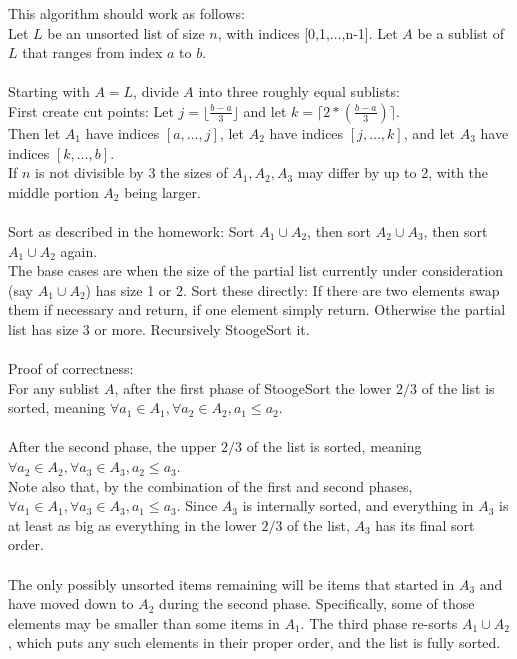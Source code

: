 \documentclass[11pt]{article}
\begin{document}
This algorithm should work as follows: \\
Let $L$ be an unsorted list of size $n$, with indices [0,1,...,n-1]. Let $A$ be a sublist of $L$ that ranges from index $a$ to $b$. \\
\\
Starting with $A = L$, divide $A$ into three roughly equal sublists: \\
First create cut points: Let $j =  \lfloor \frac{b-a}{3} \rfloor $ and let $k =  \lceil 2 * ( \frac{b-a}{3}) \rceil$. \\
Then let $A_1$ have indices $[a, \dots, j]$, let $A_2$ have indices $[j, \dots, k]$, and let $A_3$ have indices $[k, \dots, b]$. \\
If $n$ is not divisible by 3 the sizes of $A_1, A_2, A_3$ may differ by up to 2, with the middle portion $A_2$ being larger.
\\
\\
Sort as described in the homework: Sort $A_1 \cup A_2$, then sort $A_2 \cup A_3$, then sort $A_1 \cup A_2$ again.  \\
The base cases are when the size of the partial list currently under consideration (say  $A_1 \cup A_2$) has size 1 or 2. Sort these directly: If there are two elements swap them if necessary and return, if one element simply return. Otherwise the partial list has size 3 or more. Recursively StoogeSort it.
\\
\\
Proof of correctness: \\
For any sublist $A$, after the first phase of StoogeSort the lower $2/3$ of the list is sorted, meaning $\forall a_1 \in A_1, \forall a_2 \in A_2, a_1 \le a_2$.
\\
\\
After the second phase, the upper $2/3$ of the list is sorted, meaning $\forall a_2 \in A_2, \forall a_3 \in A_3, a_2 \le a_3$. \\
Note also that, by the combination of the first and second phases, $\forall a_1 \in A_1, \forall a_3 \in A_3, a_1 \le a_3$. Since $A_3$ is internally sorted, and everything in $A_3$ is at least as big as everything in the lower $2/3$ of the list, $A_3$ has its final sort order.
\\
\\
The only possibly unsorted items remaining will be items that started in $A_3$ and have moved down to $A_2$ during the second phase. Specifically, some of those elements may be smaller than some items in $A_1$. The third phase re-sorts $A_1 \cup A_2$, which puts any such elements in their proper order, and the list is fully sorted.
\end{document}
